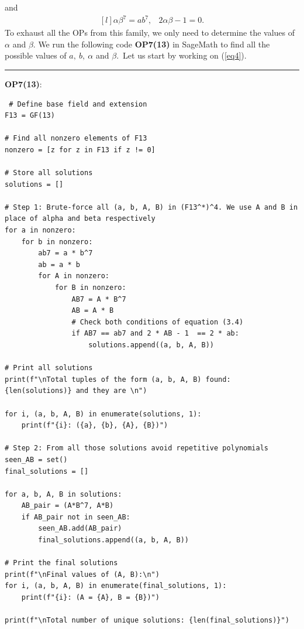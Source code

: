 \documentclass[12pt,a4wide, reqno]{amsart}
\theoremstyle{definition}
\theoremstyle{remark}
\numberwithin{equation}{section}
\begin{document}
and
\begin{equation}\label{eq6}
    \begin{matrix*}[l]
         \alpha \beta ^7=ab^7, & 2\alpha \beta -1=0.
    \end{matrix*}
\end{equation}
 To exhaust all the OPs from this family, we only need to determine the values of $\alpha$ and $\beta.$ We run the following code \textbf{OP7(13)} in SageMath to find all the possible values of $a,~b,~\alpha$ and $\beta.$~Let us start by working on (\ref{eq4}).
 \vspace{0.5 cm}
 \hrule
 \vspace{0.2 cm}
 \textbf{OP7(13)}:
 \vspace{0.2 cm}
 \vspace{0.1 cm}
 \begin{lstlisting}
 # Define base field and extension
F13 = GF(13)

# Find all nonzero elements of F13
nonzero = [z for z in F13 if z != 0]

# Store all solutions
solutions = []

# Step 1: Brute-force all (a, b, A, B) in (F13^*)^4. We use A and B in place of alpha and beta respectively
for a in nonzero:
    for b in nonzero:
        ab7 = a * b^7
        ab = a * b
        for A in nonzero:
            for B in nonzero:
                AB7 = A * B^7
                AB = A * B
                # Check both conditions of equation (3.4)
                if AB7 == ab7 and 2 * AB - 1  == 2 * ab:
                    solutions.append((a, b, A, B))

# Print all solutions
print(f"\nTotal tuples of the form (a, b, A, B) found: {len(solutions)} and they are \n")

for i, (a, b, A, B) in enumerate(solutions, 1):
    print(f"{i}: ({a}, {b}, {A}, {B})")

# Step 2: From all those solutions avoid repetitive polynomials
seen_AB = set()
final_solutions = []

for a, b, A, B in solutions:
    AB_pair = (A*B^7, A*B)
    if AB_pair not in seen_AB:
        seen_AB.add(AB_pair)
        final_solutions.append((a, b, A, B))

# Print the final solutions
print(f"\nFinal values of (A, B):\n")
for i, (a, b, A, B) in enumerate(final_solutions, 1):
    print(f"{i}: (A = {A}, B = {B})")

print(f"\nTotal number of unique solutions: {len(final_solutions)}")
\end{lstlisting}
\end{document}
